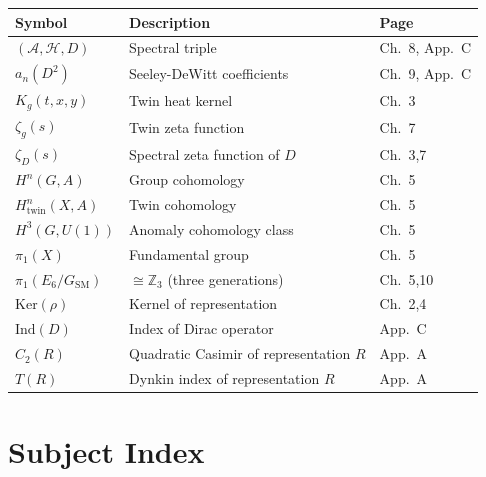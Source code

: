 \documentclass[11pt,a4paper,openright]{book}
\theoremstyle{plain}
\theoremstyle{definition}
\begin{document}
\begin{tabular}{lll}
\textbf{Symbol} & \textbf{Description} & \textbf{Page} \\
\hline
$(\mathcal{A}, \mathcal{H}, D)$ & Spectral triple & Ch.~8, App.~C \\
$a_n(D^2)$ & Seeley-DeWitt coefficients & Ch.~9, App.~C \\
$K_g(t, x, y)$ & Twin heat kernel & Ch.~3 \\
$\zeta_g(s)$ & Twin zeta function & Ch.~7 \\
$\zeta_D(s)$ & Spectral zeta function of $D$ & Ch.~3,7 \\
$H^n(G, A)$ & Group cohomology & Ch.~5 \\
$H^n_{\mathrm{twin}}(X, A)$ & Twin cohomology & Ch.~5 \\
$H^3(G, U(1))$ & Anomaly cohomology class & Ch.~5 \\
$\pi_1(X)$ & Fundamental group & Ch.~5 \\
$\pi_1(E_6/G_{\mathrm{SM}})$ & $\cong \mathbb{Z}_3$ (three generations) & Ch.~5,10 \\
$\mathrm{Ker}(\rho)$ & Kernel of representation & Ch.~2,4 \\
$\mathrm{Ind}(D)$ & Index of Dirac operator & App.~C \\
$C_2(R)$ & Quadratic Casimir of representation $R$ & App.~A \\
$T(R)$ & Dynkin index of representation $R$ & App.~A \\
\end{tabular}

\newpage

\chapter*{Subject Index}
\end{document}
